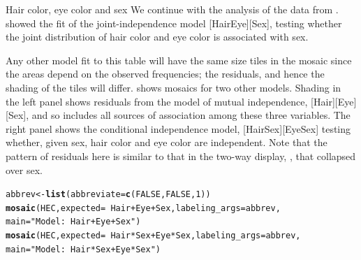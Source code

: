 \documentclass[11pt]{book}\usepackage[]{graphicx}\usepackage[]{color}
\makeatletter
\newcommand{\hlnum}[1]{\textcolor[rgb]{0.686,0.059,0.569}{#1}}%
\newcommand{\hlstr}[1]{\textcolor[rgb]{0.192,0.494,0.8}{#1}}%
\newcommand{\hlopt}[1]{\textcolor[rgb]{0,0,0}{#1}}%
\newcommand{\hlstd}[1]{\textcolor[rgb]{0.345,0.345,0.345}{#1}}%
\newcommand{\hlkwb}[1]{\textcolor[rgb]{0.69,0.353,0.396}{#1}}%
\newcommand{\hlkwc}[1]{\textcolor[rgb]{0.333,0.667,0.333}{#1}}%
\newcommand{\hlkwd}[1]{\textcolor[rgb]{0.737,0.353,0.396}{\textbf{#1}}}%
\newenvironment{kframe}{%
 \def\at@end@of@kframe{}%
 \ifinner\ifhmode%
  \def\at@end@of@kframe{\end{minipage}}%
  \begin{minipage}{\columnwidth}%
 \fi\fi%
 \def\FrameCommand##1{\hskip\@totalleftmargin \hskip-\fboxsep
 \colorbox{shadecolor}{##1}\hskip-\fboxsep
     \hskip-\linewidth \hskip-\@totalleftmargin \hskip\columnwidth}%
 \MakeFramed {\advance\hsize-\width
   \@totalleftmargin\z@ \linewidth\hsize
   \@setminipage}}%
 {\par\unskip\endMakeFramed%
 \at@end@of@kframe}
\newenvironment{knitrout}{}{} %
\renewenvironment{knitrout}{\small\renewcommand{\baselinestretch}{.85}}{} %
\makeatother
\begin{document}

\begin{Example}[HEC2]{Hair color, eye color and sex}
We continue with the analysis of the  data from
.   showed the fit of the
joint-independence model [HairEye][Sex], testing whether
the joint distribution of hair color and eye color is
associated with sex.

Any other model fit to this table will have the same size tiles in the mosaic
since the areas depend on the observed frequencies;  the residuals,
and hence the shading of the tiles will differ.  
shows mosaics for two other models. Shading in the left panel shows 
residuals from the model of mutual independence, [Hair][Eye][Sex], and so
includes all sources of association among these three variables.
The right panel shows the
conditional independence model, [HairSex][EyeSex]
testing whether, given sex, hair color and eye color are independent.
Note that the pattern of residuals here is
similar to that in the two-way display,
, that collapsed over sex.

\begin{knitrout}
\color{fgcolor}\begin{kframe}
\begin{alltt}
\hlstd{abbrev} \hlkwb{<-} \hlkwd{list}\hlstd{(}\hlkwc{abbreviate}\hlstd{=}\hlkwd{c}\hlstd{(}\hlnum{FALSE}\hlstd{,} \hlnum{FALSE}\hlstd{,} \hlnum{1}\hlstd{))}
\hlkwd{mosaic}\hlstd{(HEC,} \hlkwc{expected} \hlstd{=} \hlopt{~} \hlstd{Hair} \hlopt{+} \hlstd{Eye} \hlopt{+} \hlstd{Sex,} \hlkwc{labeling_args}\hlstd{=abbrev,}
  \hlkwc{main}\hlstd{=}\hlstr{"Model: ~Hair + Eye + Sex"}\hlstd{)}
\hlkwd{mosaic}\hlstd{(HEC,} \hlkwc{expected} \hlstd{=} \hlopt{~} \hlstd{Hair}\hlopt{*}\hlstd{Sex} \hlopt{+} \hlstd{Eye}\hlopt{*}\hlstd{Sex,} \hlkwc{labeling_args}\hlstd{=abbrev,}
        \hlkwc{main}\hlstd{=}\hlstr{"Model: ~Hair*Sex + Eye*Sex"}\hlstd{)}
\end{alltt}
\end{kframe}\begin{figure}[htbp]



\end{figure}
\end{knitrout}
\end{Example}
\end{document}
